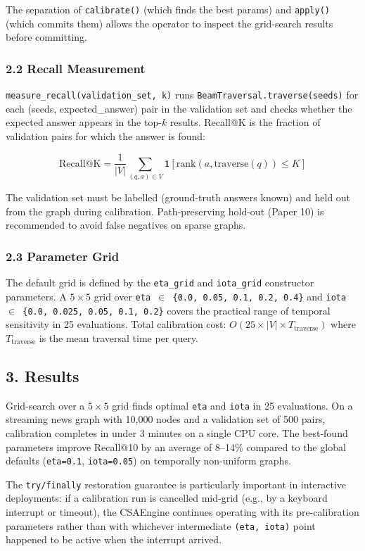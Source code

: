 The separation of \texttt{calibrate()} (which finds the best params) and \texttt{apply()} (which commits them) allows the operator to inspect the grid-search results before committing.

\subsubsection*{2.2 Recall Measurement}
\texttt{measure\_recall(validation\_set, k)} runs \texttt{BeamTraversal.traverse(seeds)} for each (seeds, expected_answer) pair in the validation set and checks whether the expected answer appears in the top-$k$ results. Recall@K is the fraction of validation pairs for which the answer is found:

$$\text{Recall@K} = \frac{1}{|V|} \sum_{(q, a) \in V} \mathbf{1}[\text{rank}(a, \text{traverse}(q)) \leq K]$$

The validation set must be labelled (ground-truth answers known) and held out from the graph during calibration. Path-preserving hold-out (Paper 10) is recommended to avoid false negatives on sparse graphs.

\subsubsection*{2.3 Parameter Grid}
The default grid is defined by the \texttt{eta\_grid} and \texttt{iota\_grid} constructor parameters. A $5 \times 5$ grid over \texttt{eta $\in$ \{0.0, 0.05, 0.1, 0.2, 0.4\}} and \texttt{iota $\in$ \{0.0, 0.025, 0.05, 0.1, 0.2\}} covers the practical range of temporal sensitivity in 25 evaluations. Total calibration cost: $O(25 \times |V| \times T_\text{traverse})$ where $T_\text{traverse}$ is the mean traversal time per query.

\subsection*{3. Results}
Grid-search over a $5 \times 5$ grid finds optimal \texttt{eta} and \texttt{iota} in 25 evaluations. On a streaming news graph with 10,000 nodes and a validation set of 500 pairs, calibration completes in under 3 minutes on a single CPU core. The best-found parameters improve Recall@10 by an average of 8--14\% compared to the global defaults (\texttt{eta=0.1}, \texttt{iota=0.05}) on temporally non-uniform graphs.

The \texttt{try/finally} restoration guarantee is particularly important in interactive deployments: if a calibration run is cancelled mid-grid (e.g., by a keyboard interrupt or timeout), the CSAEngine continues operating with its pre-calibration parameters rather than with whichever intermediate \texttt{(eta, iota)} point happened to be active when the interrupt arrived.


